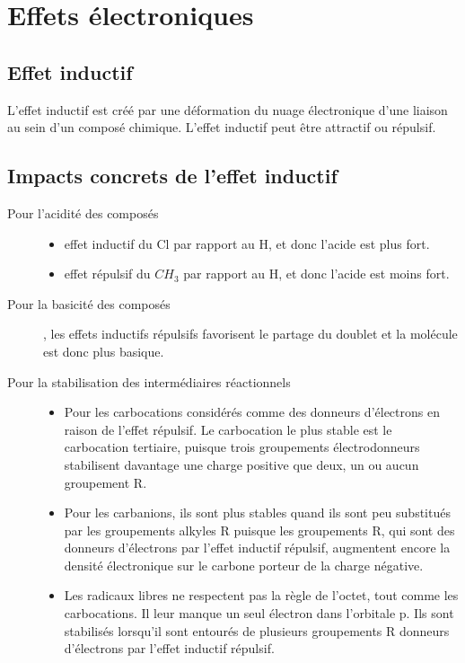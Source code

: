 \section{Effets électroniques}

\subsection{Effet inductif} L'effet inductif est créé par une déformation du nuage électronique d'une liaison au sein d'un composé chimique.
L'effet inductif peut être attractif ou répulsif.


\subsection{Impacts concrets de l'effet inductif}

\begin{description}

  \item[Pour l'acidité des composés]

    \begin{itemize}
      \item effet inductif du Cl par rapport au H, et donc l'acide est plus fort.
      \item effet répulsif du $CH_3$ par rapport au H, et donc l'acide est moins fort.
    \end{itemize}


  \item[Pour la basicité des composés], les effets inductifs répulsifs favorisent le partage du doublet et la molécule est donc plus basique.

  \item[Pour la stabilisation des intermédiaires réactionnels]
    \begin{itemize}
      \item Pour les carbocations considérés comme des donneurs d'électrons en raison de l'effet répulsif.
        Le carbocation le plus stable est le carbocation tertiaire, puisque trois groupements électrodonneurs stabilisent davantage une charge positive que deux, un ou aucun groupement R.
      \item Pour les carbanions, ils sont plus stables quand ils sont peu substitués par les groupements alkyles R puisque les groupements R, qui sont des donneurs d'électrons par  l'effet inductif répulsif, augmentent encore la densité électronique sur le carbone porteur de la charge négative.
      \item Les radicaux libres ne respectent pas la règle de l'octet, tout comme les carbocations.
        Il leur manque un seul électron dans l'orbitale p.
        Ils sont stabilisés lorsqu'il sont entourés de plusieurs groupements R donneurs d'électrons par l'effet inductif répulsif.
    \end{itemize}
\end{description}

